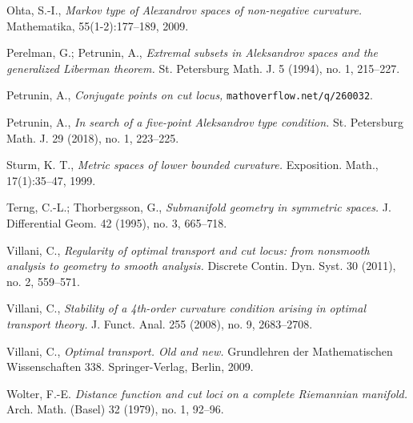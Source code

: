 \documentclass{article}
\begin{document}
\begin{thebibliography}{52}
  Ohta, S.-I.,
\emph{Markov type of Alexandrov spaces of non-negative curvature.} Mathematika, 55(1-2):177--189, 2009.

 Perelman, G.; Petrunin, A., \emph{Extremal subsets in Aleksandrov spaces and the generalized Liberman theorem.} St. Petersburg Math. J. 5 (1994), no. 1, 215--227.

 Petrunin, A., \emph{Conjugate points on cut locus,} \texttt{mathoverflow.net/q/260032}.

 Petrunin, A., \emph{In search of a five-point Aleksandrov type condition.} St. Petersburg Math. J. 29 (2018), no. 1, 223--225.


  Sturm, K. T., \emph{Metric spaces of lower bounded curvature.} Exposition. Math., 17(1):35–47, 1999.


  Terng, C.-L.;  Thorbergsson, G.,
\emph{Submanifold geometry in symmetric spaces.} J. Differential Geom. 42 (1995), no. 3, 665--718.

 Villani, C., \emph{Regularity of optimal transport and cut locus: from nonsmooth analysis to geometry to smooth analysis.} Discrete Contin. Dyn. Syst. 30 (2011), no. 2, 559–571. 
 
 Villani, C., \emph{Stability of a 4th-order curvature condition arising in optimal transport theory.}
J. Funct. Anal. 255 (2008), no. 9, 2683--2708.

 
  Villani, C., \emph{Optimal transport. Old and new.} Grundlehren der Mathematischen Wissenschaften 338. Springer-Verlag, Berlin, 2009.

 Wolter, F.-E.
\emph{Distance function and cut loci on a complete Riemannian manifold.}
Arch. Math. (Basel) 32 (1979), no. 1, 92--96.
\end{thebibliography}

%
\Addresses
\end{document}
